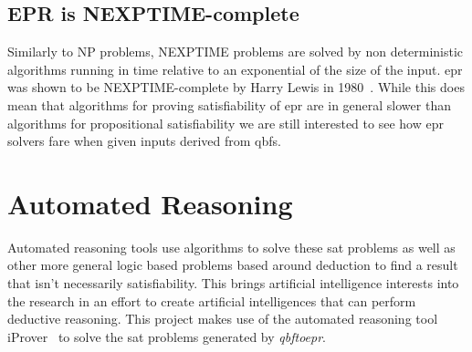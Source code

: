 \subsection{EPR is NEXPTIME-complete} \label{eprnexptime}
Similarly to NP problems, NEXPTIME problems are solved by non deterministic algorithms running in time relative to an exponential of the size of the input. \Gls{epr} was shown to be NEXPTIME-complete by Harry Lewis in 1980~\cite{lewis1980complexity}. While this does mean that algorithms for proving satisfiability of \gls{epr} are in general slower than algorithms for propositional satisfiability we are still interested to see how \gls{epr} solvers fare when given inputs derived from \glspl{qbf}.

\section{Automated Reasoning}
Automated reasoning tools use algorithms to solve these \gls{sat} problems as well as other more general logic based problems based around deduction to find a result that isn't necessarily satisfiability. This brings artificial intelligence interests into the research in an effort to create artificial intelligences that can perform deductive reasoning. This project makes use of the automated reasoning tool iProver~\cite{korovin2008iprover} to solve the \gls{sat} problems generated by \textit{qbftoepr}.
